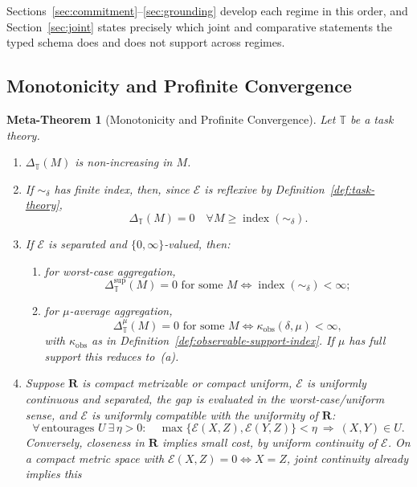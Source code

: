 \documentclass[12pt]{article}
\newtheorem{metatheorem}[theorem]{Meta-Theorem}
\theoremstyle{definition}
\begin{document}
Sections~\ref{sec:commitment}--\ref{sec:grounding} develop each regime in
this order, and Section~\ref{sec:joint} states precisely which joint and
comparative statements the typed schema does and does not support across
regimes.

\subsection{Monotonicity and Profinite Convergence}
\label{subsec:meta-monotone}

\begin{metatheorem}[Monotonicity and Profinite Convergence]
\label{meta:monotone}
Let $\mathbb T$ be a task theory.
\begin{enumerate}[label=(\roman*)]
\item $\Delta_{\mathbb T}(M)$ is non-increasing in $M$.
\item If $\sim_\delta$ has finite index, then, since $\mathcal E$ is reflexive
by Definition~\ref{def:task-theory},
\[
\Delta_{\mathbb T}(M)=0
\quad
\forall M\ge\operatorname{index}(\sim_\delta).
\]
\item If $\mathcal E$ is separated and $\{0,\infty\}$-valued, then:
\begin{enumerate}[label=(\alph*)]
\item for worst-case aggregation,
\[
\Delta_{\mathbb T}^{\sup}(M)=0
\text{ for some }M
\iff
\operatorname{index}(\sim_\delta)<\infty;
\]
\item for $\mu$-average aggregation,
\[
\Delta_{\mathbb T}^{\mu}(M)=0
\text{ for some }M
\iff
\kappa_{\mathrm{obs}}(\delta,\mu)<\infty,
\]
with $\kappa_{\mathrm{obs}}$ as in
Definition~\ref{def:observable-support-index}.  If $\mu$ has full support this
reduces to~(a).
\end{enumerate}
\item Suppose $\mathbf R$ is compact metrizable or compact uniform,
$\mathcal E$ is uniformly continuous and separated, the gap is evaluated in
the worst-case/uniform sense, and $\mathcal E$ is \emph{uniformly compatible}
with the uniformity of $\mathbf R$:
\[
\forall\,\text{entourages }U\ \exists\,\eta>0:\quad
\max\{\mathcal E(X,Z),\mathcal E(Y,Z)\}<\eta
\ \Longrightarrow\ (X,Y)\in U .
\]
Conversely, closeness in $\mathbf R$ implies small cost, by uniform continuity
of $\mathcal E$.  On a compact metric space with
$\mathcal E(X,Z)=0\iff X=Z$, joint continuity already implies this

\end{enumerate}
\end{metatheorem}
\end{document}
